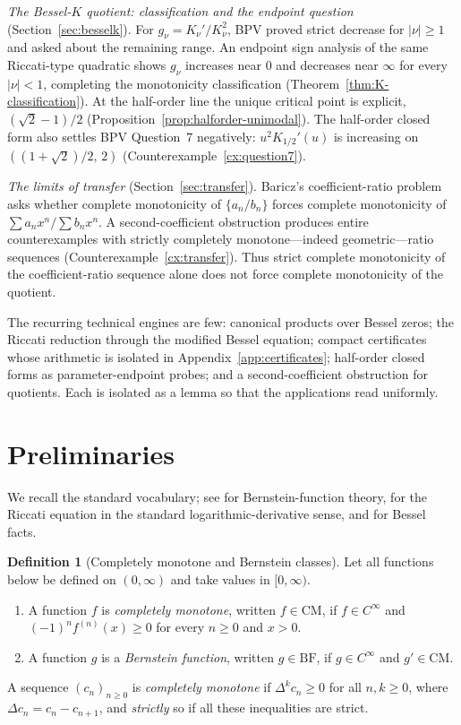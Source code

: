 \documentclass[preprint,12pt]{elsarticle}
\theoremstyle{plain}
\theoremstyle{definition}
\newtheorem{definition}[theorem]{Definition}
\theoremstyle{remark}
\newcommand{\CM}{\mathrm{CM}}
\newcommand{\BF}{\mathrm{BF}}
\begin{document}
\emph{The Bessel-\(K\) quotient: classification and the endpoint question}
(Section~\ref{sec:besselk}). For \(g_\nu=K_\nu'/K_\nu^2\), BPV proved strict
decrease for \(|\nu|\ge1\) and asked about the remaining range. An endpoint
sign analysis of the same Riccati-type quadratic shows \(g_\nu\) increases
near \(0\) and decreases near \(\infty\) for every \(|\nu|<1\), completing the
monotonicity classification (Theorem~\ref{thm:K-classification}). At the
half-order line the unique critical point is explicit, \((\sqrt2-1)/2\)
(Proposition~\ref{prop:halforder-unimodal}). The half-order closed form also
settles BPV Question~7 negatively: \(u^2K_{1/2}'(u)\) is increasing on
\(((1+\sqrt2)/2,\,2)\) (Counterexample~\ref{cx:question7}).

\emph{The limits of transfer} (Section~\ref{sec:transfer}). Baricz's
coefficient-ratio problem asks whether complete monotonicity of
\(\{a_n/b_n\}\) forces complete monotonicity of
\(\sum a_nx^n/\sum b_nx^n\). A second-coefficient obstruction produces entire
counterexamples with strictly completely monotone---indeed geometric---ratio
sequences (Counterexample~\ref{cx:transfer}). Thus strict complete
monotonicity of the coefficient-ratio sequence alone does not force complete
monotonicity of the quotient.

The recurring technical engines are few: canonical products over Bessel
zeros; the Riccati reduction through the modified Bessel equation; compact
certificates whose arithmetic is isolated in Appendix~\ref{app:certificates};
half-order closed forms as parameter-endpoint probes; and a
second-coefficient obstruction for quotients. Each is isolated as a lemma so
that the applications read uniformly.

\section{Preliminaries}\label{sec:prelim}

We recall the standard vocabulary; see \cite{schilling-song-vondracek} for
Bernstein-function theory, \cite{ince} for the Riccati equation in the
standard logarithmic-derivative sense, and \cite{watson,dlmf} for Bessel
facts.

\begin{definition}[Completely monotone and Bernstein classes]\label{def:classes}
Let all functions below be defined on \((0,\infty)\) and take values in
\([0,\infty)\).
\begin{enumerate}[label=\textup{(\roman*)},leftmargin=2.3em]
\item A function \(f\) is \emph{completely monotone}, written \(f\in\CM\), if
\(f\in C^\infty\) and \((-1)^n f^{(n)}(x)\ge0\) for every \(n\ge0\) and
\(x>0\).
\item A function \(g\) is a \emph{Bernstein function}, written \(g\in\BF\), if
\(g\in C^\infty\) and \(g'\in\CM\).
\end{enumerate}
A sequence \((c_n)_{n\ge0}\) is \emph{completely monotone} if
\(\Delta^kc_n\ge0\) for all \(n,k\ge0\), where \(\Delta c_n=c_n-c_{n+1}\), and
\emph{strictly} so if all these inequalities are strict.
\end{definition}
\end{document}

